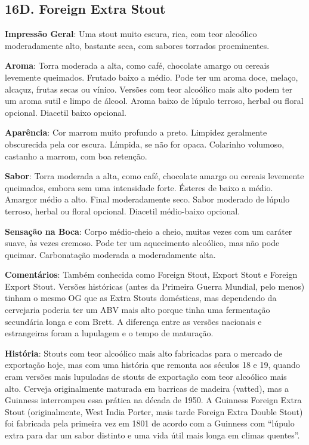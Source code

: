 \subsection*{16D. Foreign Extra Stout}
\textbf{Impressão Geral}: Uma stout muito escura, rica, com teor alcoólico moderadamente alto, bastante seca, com sabores torrados proeminentes.

\textbf{Aroma}: Torra moderada a alta, como café, chocolate amargo ou cereais levemente queimados. Frutado baixo a médio. Pode ter um aroma doce, melaço, alcaçuz, frutas secas ou vínico. Versões com teor alcoólico mais alto podem ter um aroma sutil e limpo de álcool. Aroma baixo de lúpulo terroso, herbal ou floral opcional. Diacetil baixo opcional.

\textbf{Aparência}: Cor marrom muito profundo a preto. Limpidez geralmente obscurecida pela cor escura. Límpida, se não for opaca. Colarinho volumoso, castanho a marrom, com boa retenção.

\textbf{Sabor}: Torra moderada a alta, como café, chocolate amargo ou cereais levemente queimados, embora sem uma intensidade forte. Ésteres de baixo a médio. Amargor médio a alto. Final moderadamente seco. Sabor moderado de lúpulo terroso, herbal ou floral opcional. Diacetil médio-baixo opcional.

\textbf{Sensação na Boca}: Corpo médio-cheio a cheio, muitas vezes com um caráter suave, às vezes cremoso. Pode ter um aquecimento alcoólico, mas não pode queimar. Carbonatação moderada a moderadamente alta.

\textbf{Comentários}: Também conhecida como Foreign Stout, Export Stout e Foreign Export Stout. Versões históricas (antes da Primeira Guerra Mundial, pelo menos) tinham o mesmo OG que as Extra Stouts domésticas, mas dependendo da cervejaria poderia ter um ABV mais alto porque tinha uma fermentação secundária longa e com Brett. A diferença entre as versões nacionais e estrangeiras foram a lupulagem e o tempo de maturação.

\textbf{História}: Stouts com teor alcoólico mais alto fabricadas para o mercado de exportação hoje, mas com uma história que remonta aos séculos 18 e 19, quando eram versões mais lupuladas de stouts de exportação com teor alcoólico mais alto. Cerveja originalmente maturada em barricas de madeira (vatted), mas a Guinness interrompeu essa prática na década de 1950. A Guinness Foreign Extra Stout (originalmente, West India Porter, mais tarde Foreign Extra Double Stout) foi fabricada pela primeira vez em 1801 de acordo com a Guinness com “lúpulo extra para dar um sabor distinto e uma vida útil mais longa em climas quentes”.

